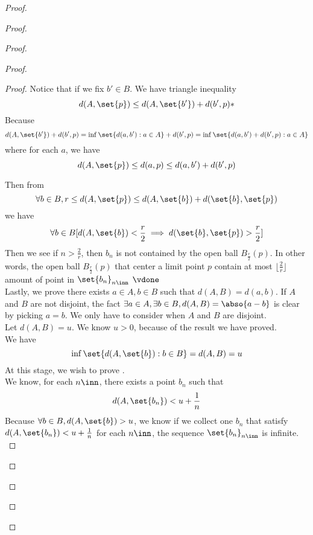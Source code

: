 \documentclass{report}
\begin{document}
\begin{proof}
\begin{proof}
\begin{proof}
\begin{proof}
\begin{proof}
Notice that if we fix $b'\in B$. We have triangle inequality
\begin{equation}
d(A,\set{p})\leq d(A,\set{b'})+d(b',p)*
\end{equation}
Because 
\begin{equation}
d(A,\set{b'})+d(b',p)=\inf \set{d(a,b'):a \in A}+d(b',p)=\inf \set{d(a,b')+d(b',p):a \in A}
\end{equation}
where for each $a$, we have
 \begin{equation}
d(A,\set{p})\leq d(a,p)\leq d(a,b')+d(b',p)
\end{equation}



Then from
\begin{equation}
  \forall b\in B, r\leq d(A,\set{p})\leq d(A,\set{b})+d(\set{b},\set{p})
\end{equation}
we have
\begin{equation}
  \forall b\in B [d(A,\set{b})< \frac{r}{2}\implies d(\set{b},\set{p})>\frac{r}{2}]
\end{equation}
Then we see if $n>\frac{2}{r}$, then $b_n$ is not contained by the open ball  $B_{\frac{r}{2}}(p)$. In other words, the open ball $B_{\frac{r}{2}}(p)$ that center a limit point $p$ contain at most $\lfloor \frac{2}{r}\rfloor$ amount of point in $\set{b_n}_{n\inn}$ \CaC$\vdone$\\

Lastly, we prove there exists $a\in A,b\in B$ such that $d(A,B)=d(a,b)$. If  $A$ and  $B$ are not disjoint, the fact $\exists a\in A,\exists b\in B, d(A,B)=\abso{a-b}$ is clear by picking $a=b$. We only have to consider when $A$ and $B$ are disjoint.\\

Let $d(A,B)=u$. We know $u>0$, because of the result we have proved.\\

We have 
\begin{equation}
  \inf \set{d(A,\set{b}):b\in B}=d(A,B)=u
\end{equation}
At this stage, we wish to prove . \\

We know, for each $n\inn$, there exists a point $b_n$ such that
 \begin{equation}
d(A,\set{b_n})<u+\frac{1}{n}
\end{equation}
Because $\forall b\in B, d(A,\set{b})>u$, we know if we collect one $b_n$ that satisfy $d(A,\set{b_n})<u+\frac{1}{n}$ for each $n\inn$, the sequence $\set{b_n}_{n\inn}$ is infinite.\\


\end{proof}
\end{proof}
\end{proof}
\end{proof}
\end{proof}
\end{document}
